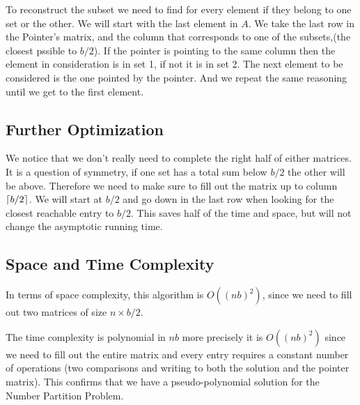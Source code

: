 \documentclass[11pt]{article}
\DeclarePairedDelimiter\ceil{\lceil}{\rceil}
\begin{document}
To reconstruct the subset we need to find for every element if they belong to one set or the other. We will start with the last element in $A$. We take the last row in the Pointer's matrix, and the column that corresponds to one of the subsets,(the closest pssible to $b/2$). If the pointer is pointing to the same column then the element in consideration is in set 1, if not it is in set 2. The next element to be considered is the one pointed by the pointer. And we repeat the same reasoning until we get to the first element.

\subsection{Further Optimization}
We notice that we don't really need to complete the right half of either matrices. It is a question of symmetry, if one set has a total sum below $b/2$ the other will be above. Therefore we need to make sure to fill out the matrix up to column $\ceil*{b/2}$. We will start at $b/2$ and go down in the last row when looking for the closest reachable entry to $b/2$.
This saves half of the time and space, but will not change the asymptotic running time. 

\subsection{Space and Time Complexity}

In terms of space complexity, this algorithm is $O((nb)^2)$, since we need to fill out two matrices of size $n\times b/2$.

The time complexity is polynomial in $nb$ more precisely it is $O((nb)^2)$ since we need to fill out the entire matrix and every entry requires a constant number of operations (two comparisons and writing to both the solution and the pointer matrix). This confirms that we have a pseudo-polynomial solution for the Number Partition Problem. 
\end{document}

